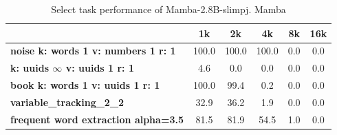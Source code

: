 \begin{table}[!h]
\centering
\footnotesize
\begin{tabular}{@{}lccccc@{}}
\toprule
                               & 1k             & 2k    & 4k    & 8k  & 16k \\ \midrule
\textbf{noise k: words 1 v: numbers 1 r: 1} & 100.0 & 100.0 & 100.0 & 0.0 & 0.0 \\
\textbf{k: uuids $\infty$ v: uuids 1 r: 1}   & 4.6      & 0.0   & 0.0   & 0.0 & 0.0 \\
\textbf{book k: words 1 v: uuids 1 r: 1} & 100.0   & 99.4  & 0.2   & 0.0 & 0.0 \\
\textbf{variable\_tracking\_2\_2}    & 32.9   & 36.2  & 1.9   & 0.0 & 0.0 \\
\textbf{frequent word extraction alpha=3.5} & 81.5 & 81.9  & 54.5  & 1.0 & 0.0 \\ \bottomrule
\end{tabular}
\caption{Select task performance of Mamba-2.8B-slimpj. Mamba  }
\label{tab:mamba_result}
\end{table}
